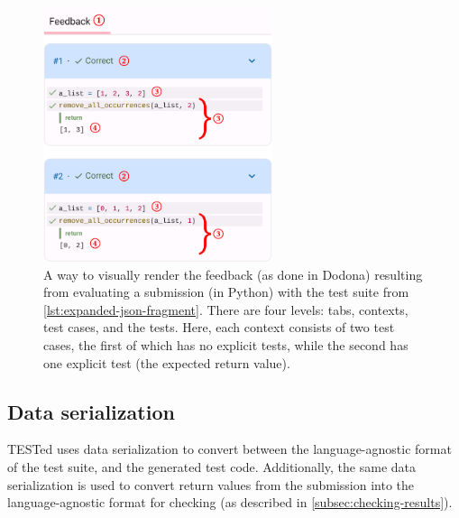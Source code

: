 \documentclass[../main]{subfiles}
\begin{document}
\begin{figure}
    \centering
    \includegraphics[width=0.6\textwidth]{dodona-rendering}
    \caption{A way to visually render the feedback (as done in Dodona) resulting from evaluating a submission (in Python) with the test suite from \cref{lst:expanded-json-fragment}.
    There are four levels:  tabs,  contexts,  test cases, and  the tests.
    Here, each context consists of two test cases, the first of which has no explicit tests, while the second has one explicit test (the expected return value).}
    \label{fig:dodona}
\end{figure}

\subsection{Data serialization}\label{subsec:data-serialization}

TESTed uses data serialization to convert between the language-agnostic format of the test suite, and the generated test code.
Additionally, the same data serialization is used to convert return values from the submission into the language-agnostic format for checking (as described in \cref{subsec:checking-results}).
\end{document}
